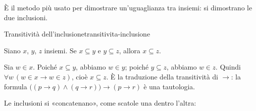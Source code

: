 È il metodo più usato per dimostrare un'uguaglianza tra insiemi: si dimostrano le due inclusioni.

\begin{concetto}
\begin{Proposizione}{Transitività dell'inclusione}{transitivita-inclusione}
    \begin{prerequisiti}
    \end{prerequisiti}
    Siano $x$, $y$, $z$ insiemi. Se $x \subseteq y$ e $y \subseteq z$, allora $x \subseteq z$.
\end{Proposizione}
\begin{dimostrazione}
    Sia $w \in x$. Poiché $x \subseteq y$, abbiamo $w \in y$; poiché $y \subseteq z$, abbiamo $w \in z$.
    Quindi $\forall w\,(w \in x \rightarrow w \in z)$, cioè $x \subseteq z$. È la traduzione della transitività di
    $\rightarrow$: la formula $\big((p \rightarrow q) \wedge (q \rightarrow r)\big) \rightarrow (p \rightarrow r)$ è una tautologia.
\end{dimostrazione}
\end{concetto}

\begin{spiegazione}
    Le inclusioni si «concatenano», come scatole una dentro l'altra:
    \begin{center}
    \end{center}
\end{spiegazione}



